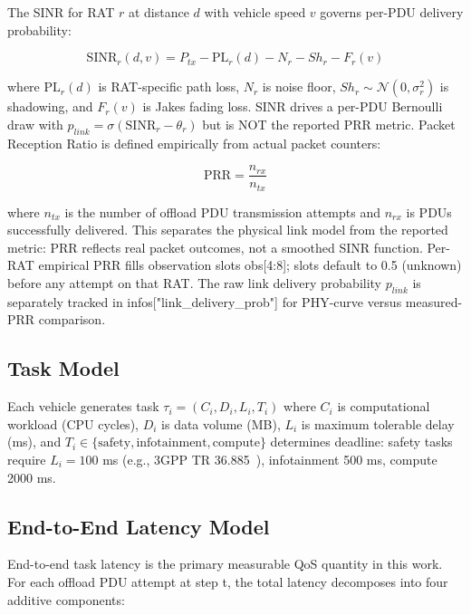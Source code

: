 The SINR for RAT $r$ at distance $d$ with vehicle speed $v$ governs per-PDU delivery probability:

\begin{equation}
\label{eq:sinr}
\text{SINR}_r(d,v) = P_{tx} - \text{PL}_r(d) - N_r - Sh_r - F_r(v)
\end{equation}

where $\text{PL}_r(d)$ is RAT-specific path loss, $N_r$ is noise floor, $Sh_r \sim \mathcal{N}(0,\sigma^2_r)$ is shadowing, and $F_r(v)$ is Jakes fading loss. SINR drives a per-PDU Bernoulli draw with $p_{link} = \sigma(\text{SINR}_r - \theta_r)$ but is NOT the reported PRR metric. Packet Reception Ratio is defined empirically from actual packet counters:

\begin{equation}
\label{eq:prr}
\text{PRR} = \frac{n_{rx}}{n_{tx}}
\end{equation}

where $n_{tx}$ is the number of offload PDU transmission attempts and $n_{rx}$ is PDUs successfully delivered. This separates the physical link model from the reported metric: PRR reflects real packet outcomes, not a smoothed SINR function. Per-RAT empirical PRR fills observation slots obs[4:8]; slots default to 0.5 (unknown) before any attempt on that RAT. The raw link delivery probability $p_{link}$ is separately tracked in infos["link\_delivery\_prob"] for PHY-curve versus measured-PRR comparison.

\subsection{Task Model}

Each vehicle generates task $\tau_i = (C_i, D_i, L_i, T_i)$ where $C_i$ is computational workload (CPU cycles), $D_i$ is data volume (MB), $L_i$ is maximum tolerable delay (ms), and $T_i \in \{\text{safety}, \text{infotainment}, \text{compute}\}$ determines deadline: safety tasks require $L_i = 100$ ms (e.g., 3GPP TR 36.885~\cite{molina2017}), infotainment 500 ms, compute 2000 ms.

\subsection{End-to-End Latency Model}

End-to-end task latency is the primary measurable QoS quantity in this work. For each offload PDU attempt at step t, the total latency decomposes into four additive components:


